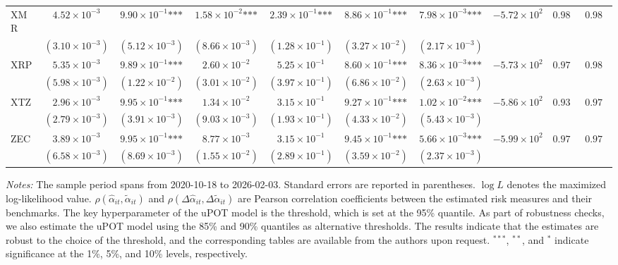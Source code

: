 \documentclass{article}
\begin{document}
\begin{landscape}
\begin{longtable}{lccccccccc}
XMR & $4.52\times 10^{-3}$ & $9.90\times 10^{-1}\text{***}$ & $1.58\times 10^{-2}\text{***}$ & $2.39\times 10^{-1}\text{***}$ & $8.86\times 10^{-1}\text{***}$ & $7.98\times 10^{-3}\text{***}$ & $-5.72\times 10^{2}$ & $0.987$ & $0.986$ \\
 & $(3.10\times 10^{-3})$ & $(5.12\times 10^{-3})$ & $(8.66\times 10^{-3})$ & $(1.28\times 10^{-1})$ & $(3.27\times 10^{-2})$ & $(2.17\times 10^{-3})$ &  &  &  \\
XRP & $5.35\times 10^{-3}$ & $9.89\times 10^{-1}\text{***}$ & $2.60\times 10^{-2}$ & $5.25\times 10^{-1}$ & $8.60\times 10^{-1}\text{***}$ & $8.36\times 10^{-3}\text{***}$ & $-5.73\times 10^{2}$ & $0.979$ & $0.981$ \\
 & $(5.98\times 10^{-3})$ & $(1.22\times 10^{-2})$ & $(3.01\times 10^{-2})$ & $(3.97\times 10^{-1})$ & $(6.86\times 10^{-2})$ & $(2.63\times 10^{-3})$ &  &  &  \\
XTZ & $2.96\times 10^{-3}$ & $9.95\times 10^{-1}\text{***}$ & $1.34\times 10^{-2}$ & $3.15\times 10^{-1}$ & $9.27\times 10^{-1}\text{***}$ & $1.02\times 10^{-2}\text{***}$ & $-5.86\times 10^{2}$ & $0.933$ & $0.971$ \\
 & $(2.79\times 10^{-3})$ & $(3.91\times 10^{-3})$ & $(9.03\times 10^{-3})$ & $(1.93\times 10^{-1})$ & $(4.33\times 10^{-2})$ & $(5.43\times 10^{-3})$ &  &  &  \\
ZEC & $3.89\times 10^{-3}$ & $9.95\times 10^{-1}\text{***}$ & $8.77\times 10^{-3}$ & $3.15\times 10^{-1}$ & $9.45\times 10^{-1}\text{***}$ & $5.66\times 10^{-3}\text{***}$ & $-5.99\times 10^{2}$ & $0.975$ & $0.977$ \\
 & $(6.58\times 10^{-3})$ & $(8.69\times 10^{-3})$ & $(1.55\times 10^{-2})$ & $(2.89\times 10^{-1})$ & $(3.59\times 10^{-2})$ & $(2.37\times 10^{-3})$ &  &  &  \\
\end{longtable}

\begin{flushleft}
{\footnotesize
\textit{Notes:} The sample period spans from 2020-10-18 to 2026-02-03. Standard errors are reported in parentheses. $\log L$ denotes the maximized log-likelihood value. $\rho(\hat{\alpha}_{it},\tilde{\alpha}_{it})$ and $\rho(\Delta\hat{\alpha}_{it},\Delta\tilde{\alpha}_{it})$ are Pearson correlation coefficients between the estimated risk measures and their benchmarks. The key hyperparameter of the uPOT model is the threshold, which is set at the 95\% quantile. As part of robustness checks, we also estimate the uPOT model using the 85\% and 90\% quantiles as alternative thresholds. The results indicate that the estimates are robust to the choice of the threshold, and the corresponding tables are available from the authors upon request. $^{***}$, $^{**}$, and $^{*}$ indicate significance at the 1\%, 5\%, and 10\% levels, respectively.
}
\end{flushleft}


\end{landscape}
\end{document}
